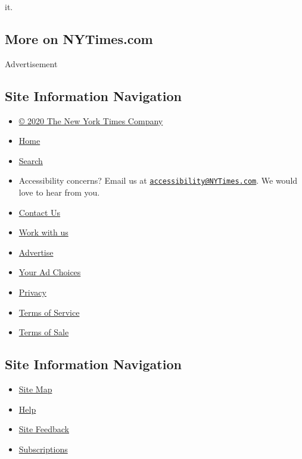 it.

\hypertarget{more-on-nytimescom}{%
\subsection{More on NYTimes.com}\label{more-on-nytimescom}}

Advertisement

\hypertarget{site-information-navigation}{%
\subsection{Site Information
Navigation}\label{site-information-navigation}}

\begin{itemize}
\tightlist
\item
  \href{https://help.nytimes3xbfgragh.onion/hc/en-us/articles/115014792127-Copyright-notice}{©
  2020 The New York Times Company}
\item
  \href{https://www.nytimes3xbfgragh.onion}{Home}
\item
  \href{https://www.nytimes3xbfgragh.onion/search/}{Search}
\item
  Accessibility concerns? Email us at
  \href{mailto:accessibility@NYTimes.com}{\nolinkurl{accessibility@NYTimes.com}}.
  We would love to hear from you.
\item
  \href{https://help.nytimes3xbfgragh.onion/hc/en-us/articles/115015385887-Contact-Us}{Contact
  Us}
\item
  \href{https://www.nytco.com/careers/}{Work with us}
\item
  \href{https://nytmediakit.com/}{Advertise}
\item
  \href{https://help.nytimes3xbfgragh.onion/hc/en-us/articles/115014892108-Privacy-policy\#pp}{Your
  Ad Choices}
\item
  \href{https://help.nytimes3xbfgragh.onion/hc/en-us/articles/115014892108-Privacy-policy}{Privacy}
\item
  \href{https://help.nytimes3xbfgragh.onion/hc/en-us/articles/115014893428-Terms-of-service}{Terms
  of Service}
\item
  \href{https://help.nytimes3xbfgragh.onion/hc/en-us/articles/115014893968-Terms-of-sale}{Terms
  of Sale}
\end{itemize}

\hypertarget{site-information-navigation-1}{%
\subsection{Site Information
Navigation}\label{site-information-navigation-1}}

\begin{itemize}
\tightlist
\item
  \href{https://spiderbites.nytimes3xbfgragh.onion}{Site Map}
\item
  \href{https://help.nytimes3xbfgragh.onion/hc/en-us}{Help}
\item
  \href{https://help.nytimes3xbfgragh.onion/hc/en-us/articles/115015385887-Contact-Us?redir=myacc}{Site
  Feedback}
\item
  \href{https://www.nytimes3xbfgragh.onion/subscription?campaignId=37WXW}{Subscriptions}
\end{itemize}
